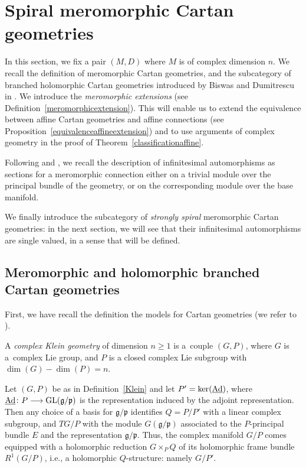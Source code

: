 \documentclass[pdftex]{sigma}
\numberwithin{equation}{section}
\begin{document}
\section{Spiral meromorphic Cartan geometries}\label{section2}
In this section, we fix a pair $(M,D)$ where $M$ is of complex dimension $n$. We recall the definition of meromorphic Cartan geometries, and the subcategory of branched holomorphic Cartan geometries introduced by Biswas and Dumitrescu in \cite{BD}.
We introduce the \textit{meromorphic extensions} (see Definition~\ref{meromorphicextension}). This will enable us to extend the equivalence between affine Cartan geometries and affine connections (see Proposition~\ref{equivalenceaffineextension}) and to use arguments of complex geometry in the proof of Theorem~\ref{classificationaffine}.

Following \cite{BlazquezCasale} and \cite{Cap4}, we recall the description of infinitesimal automorphisms as sections for a meromorphic connection either on a trivial module over the principal bundle of the geometry, or on the corresponding module over the base manifold.

We finally introduce the subcategory of \textit{strongly spiral} meromorphic Cartan geometries: in the next section, we will see that their infinitesimal automorphisms are single valued, in a sense that will be defined.

\subsection{Meromorphic and holomorphic branched Cartan geometries}
First, we have recall the definition the models for Cartan geometries (we refer to \cite[Chapter~4]{Sharpe}).
\begin{Definition}\label{Klein} A \textit{complex Klein geometry} of dimension $n\geq 1$ is a~couple $(G,P)$, where $G$ is a~complex Lie group, and $P$ is a closed complex Lie subgroup with $\dim(G)-\dim(P)=n$. \end{Definition}
Let $(G,P)$ be as in Definition~\ref{Klein} and let $P'=\ker(\underline{{\rm Ad}})$, where $\underline{{\rm Ad}}\colon P \longrightarrow {\rm GL}(\mathfrak{g}/\mathfrak{p})$ is the representation induced by the adjoint representation. Then any choice of a basis for $\mathfrak{g}/\mathfrak{p}$ identifies $Q=P/P'$ with a linear complex subgroup, and $TG/P$ with the module $G(\mathfrak{g}/\mathfrak{p})$ associated to the $P$-principal bundle $E$ and the representation $\mathfrak{g}/\mathfrak{p}$. Thus, the complex manifold $G/P$ comes equipped with a holomorphic reduction $G\times_{P} Q$ of its holomorphic frame bundle $R^1(G/P)$, i.e., a holomorphic $Q$-structure: namely $G/P'$.
\end{document}
